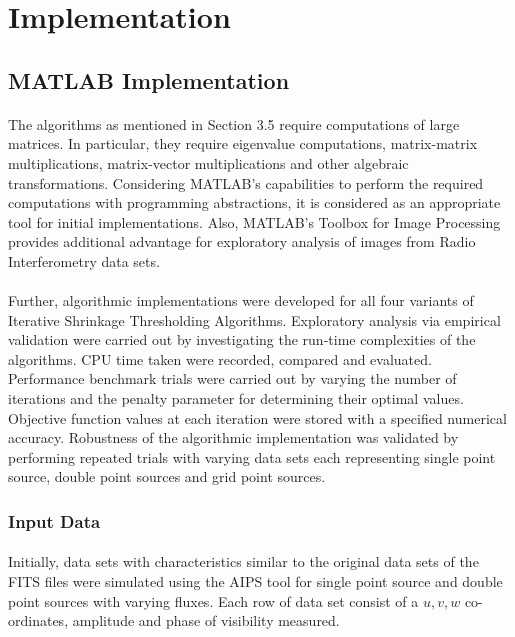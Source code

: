 \section{Implementation}
\label{s:implement}

\subsection{MATLAB Implementation}
\label{s:implement_matlab}

\paragraph{}
The algorithms as mentioned in Section 3.5 require computations 
of large matrices. In particular, they require eigenvalue computations, 
matrix-matrix multiplications, matrix-vector multiplications and other 
algebraic transformations. Considering MATLAB's capabilities to perform 
the required computations with programming abstractions, it is considered 
as an appropriate tool for initial implementations. Also, MATLAB's Toolbox 
for Image Processing provides additional advantage for exploratory analysis 
of images from Radio Interferometry data sets. 

\paragraph{}
Further, algorithmic implementations were developed for all four variants 
of Iterative Shrinkage Thresholding Algorithms. Exploratory analysis via 
empirical validation were carried out by investigating the run-time complexities 
of the algorithms. CPU time taken were recorded, compared and evaluated. 
Performance benchmark trials were carried out by varying the number 
of iterations and the penalty parameter for determining their optimal values. 
Objective function values at each iteration were stored with a specified
numerical accuracy. Robustness of the algorithmic implementation was validated
by performing repeated trials with varying data sets each representing 
single point source, double point sources and grid point sources.

\subsubsection{Input Data}

\paragraph{}
Initially, data sets with characteristics similar to the original data sets
of the FITS files were simulated using the AIPS tool for single point source 
and double point sources with varying fluxes. Each row of data set consist of
a $u,v,w$ co-ordinates, amplitude and phase of visibility measured. 

